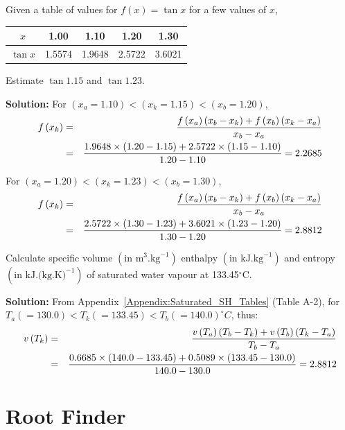     \begin{list}{\bf Example :~}{}
%       
         \item Given a table of values for $f(x)=\tan{x}$ for a few values of $x$,
            \begin{center}
               \begin{tabular}{c | c c c c}
                   $x$        & 1.00   & 1.10   & 1.20   & 1.30   \\
                   \hline
                   $\tan{x}$  & 1.5574 & 1.9648 & 2.5722 & 3.6021 \\
               \end{tabular}
            \end{center}
            Estimate $\tan{1.15}$ and $\tan{1.23}$.

            {\bf Solution:} For $\left(x_{a}=1.10\right) < \left(x_{k}=1.15\right) < \left(x_{b}=1.20\right)$,
               \begin{eqnarray}
                  f\left(x_{k}\right) &=& \displaystyle\frac{f\left(x_{a}\right)\left(x_{b}-x_{k}\right) + f\left(x_{b}\right)\left(x_{k}-x_{a}\right)}{x_{b}-x_{a}} \nonumber \\
                                     &=& \displaystyle\frac{1.9648\times(1.20-1.15) + 2.5722\times(1.15-1.10)}{1.20-1.10} = 2.2685 \nonumber
               \end{eqnarray}

For  $\left(x_{a}=1.20\right) < \left(x_{k}=1.23\right) < \left(x_{b}=1.30\right)$,
               \begin{eqnarray}
                  f\left(x_{k}\right) &=& \displaystyle\frac{f\left(x_{a}\right)\left(x_{b}-x_{k}\right) + f\left(x_{b}\right)\left(x_{k}-x_{a}\right)}{x_{b}-x_{a}} \nonumber \\
                                     &=& \displaystyle\frac{2.5722\times(1.30-1.23) + 3.6021\times(1.23-1.20)}{1.30-1.20} = 2.8812 \nonumber
               \end{eqnarray}
%
         \item Calculate specific volume $\left(\text{in m}^{3}\text{.kg}^{-1}\right)$ enthalpy $\left(\text{in kJ.kg}^{-1}\right)$ and entropy $\left(\text{in kJ.(kg.K)}^{-1}\right)$ of saturated water vapour at 133.45$^{\circ}$C.

           {\bf Solution:} From Appendix~\ref{Appendix:Saturated_SH_Tables} (Table A-2), for $T_{a}(=130.0) < T_{k} (= 133.45) < T_{b} (=140.0)^{\circ}C$, thus:
               \begin{eqnarray}
                  v\left(T_{k}\right) &=& \displaystyle\frac{v\left(T_{a}\right)\left(T_{b}-T_{k}\right) + v\left(T_{b}\right)\left(T_{k}-T_{a}\right)}{T_{b}-T_{a}} \nonumber \\
                                     &=& \displaystyle\frac{0.6685\times(140.0-133.45) + 0.5089\times(133.45-130.0)}{140.0-130.0} = 2.8812 \nonumber
               \end{eqnarray}


    \end{list}

\section{Root Finder}
